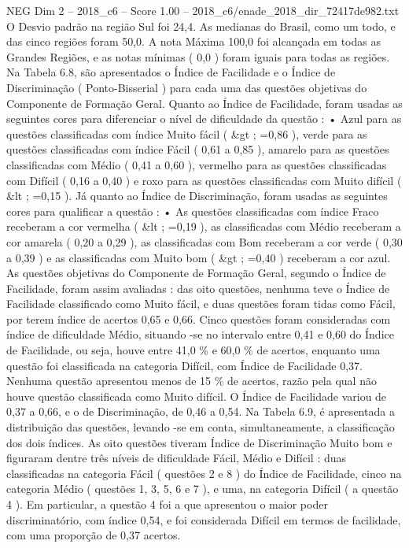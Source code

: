 \begin{textsample}{NEG Dim 2 – 2018\_c6 – Score 1.00 – 2018\_c6/enade\_2018\_dir\_72417de982.txt}
O Desvio padrão na região Sul foi 24,4.
As medianas do Brasil, como um todo, e das cinco regiões foram 50,0.
A nota Máxima 100,0 foi alcançada em todas as Grandes Regiões, e as notas mínimas ( 0,0 ) foram iguais para todas as regiões.
Na Tabela 6.8, são apresentados o Índice de Facilidade e o Índice de Discriminação ( Ponto-Bisserial ) para cada uma das questões objetivas do Componente de Formação Geral.
Quanto ao Índice de Facilidade, foram usadas as seguintes cores para diferenciar o nível de dificuldade da questão : • Azul para as questões classificadas com índice Muito fácil ( \&gt ; =0,86 ), verde para as questões classificadas com índice Fácil ( 0,61 a 0,85 ), amarelo para as questões classificadas com Médio ( 0,41 a 0,60 ), vermelho para as questões classificadas com Difícil ( 0,16 a 0,40 ) e roxo para as questões classificadas com Muito difícil ( \&lt ; =0,15 ).
Já quanto ao Índice de Discriminação, foram usadas as seguintes cores para qualificar a questão : • As questões classificadas com índice Fraco receberam a cor vermelha ( \&lt ; =0,19 ), as classificadas com Médio receberam a cor amarela ( 0,20 a 0,29 ), as classificadas com Bom receberam a cor verde ( 0,30 a 0,39 ) e as classificadas com Muito bom ( \&gt ; =0,40 ) receberam a cor azul.
As questões objetivas do Componente de Formação Geral, segundo o Índice de Facilidade, foram assim avaliadas : das oito questões, nenhuma teve o Índice de Facilidade classificado como Muito fácil, e duas questões foram tidas como Fácil, por terem índice de acertos 0,65 e 0,66.
Cinco questões foram consideradas com índice de dificuldade Médio, situando -se no intervalo entre 0,41 e 0,60 do Índice de Facilidade, ou seja, houve entre 41,0 \% e 60,0 \% de acertos, enquanto uma questão foi classificada na categoria Difícil, com Índice de Facilidade 0,37.
Nenhuma questão apresentou menos de 15 \% de acertos, razão pela qual não houve questão classificada como Muito difícil.
O Índice de Facilidade variou de 0,37 a 0,66, e o de Discriminação, de 0,46 a 0,54.
Na Tabela 6.9, é apresentada a distribuição das questões, levando -se em conta, simultaneamente, a classificação dos dois índices.
As oito questões tiveram Índice de Discriminação Muito bom e figuraram dentre três níveis de dificuldade Fácil, Médio e Difícil : duas classificadas na categoria Fácil ( questões 2 e 8 ) do Índice de Facilidade, cinco na categoria Médio ( questões 1, 3, 5, 6 e 7 ), e uma, na categoria Difícil ( a questão 4 ).
Em particular, a questão 4 foi a que apresentou o maior poder discriminatório, com índice 0,54, e foi considerada Difícil em termos de facilidade, com uma proporção de 0,37 acertos.

\end{textsample}
